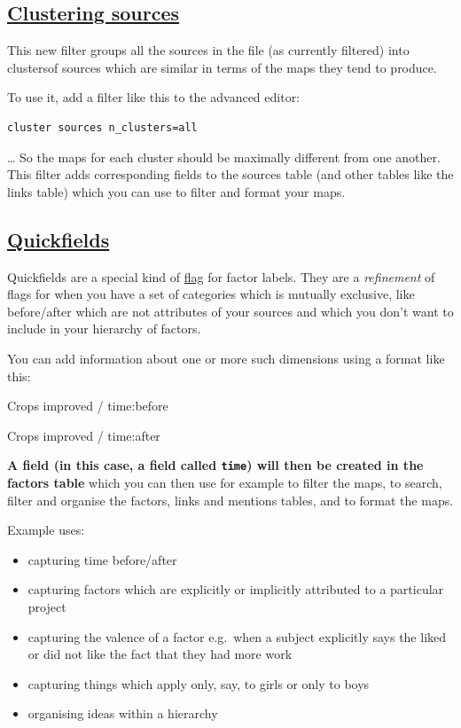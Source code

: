 \documentclass[
]{book}
\providecommand{\tightlist}{%
  \setlength{\itemsep}{0pt}\setlength{\parskip}{0pt}}
\begin{document}
\hypertarget{clustering-sources}{%
\subsection{\texorpdfstring{\protect\hyperlink{cluster-sources}{Clustering sources}}{Clustering sources}}\label{clustering-sources}}

This new filter groups all the sources in the file (as currently filtered) into clustersof sources which are similar in terms of the maps they tend to produce.

To use it, add a filter like this to the advanced editor:

\begin{verbatim}
cluster sources n_clusters=all
\end{verbatim}

\ldots{}
So the maps for each cluster should be maximally different from one another. This filter adds corresponding fields to the sources table (and other tables like the links table) which you can use to filter and format your maps.

\hypertarget{quickfields}{%
\subsection{\texorpdfstring{\protect\hyperlink{xquickfields}{Quickfields}}{Quickfields}}\label{quickfields}}

Quickfields are a special kind of \protect\hyperlink{xflag}{flag} for factor labels. They are a \emph{refinement} of flags for when you have a set of categories which is mutually exclusive, like before/after which are not attributes of your sources and which you don't want to include in your hierarchy of factors.

You can add information about one or more such dimensions using a format like this:

Crops improved / time:before

Crops improved / time:after

\textbf{A field (in this case, a field called \texttt{time}) will then be created in the factors table} which you can then use for example to filter the maps, to search, filter and organise the factors, links and mentions tables, and to format the maps.

Example uses:

\begin{itemize}
\tightlist
\item
  capturing time before/after
\item
  capturing factors which are explicitly or implicitly attributed to a particular project
\item
  capturing the valence of a factor e.g.~when a subject explicitly says the liked or did not like the fact that they had more work
\item
  capturing things which apply only, say, to girls or only to boys
\item
  organising ideas within a hierarchy
\end{itemize}
\end{document}
